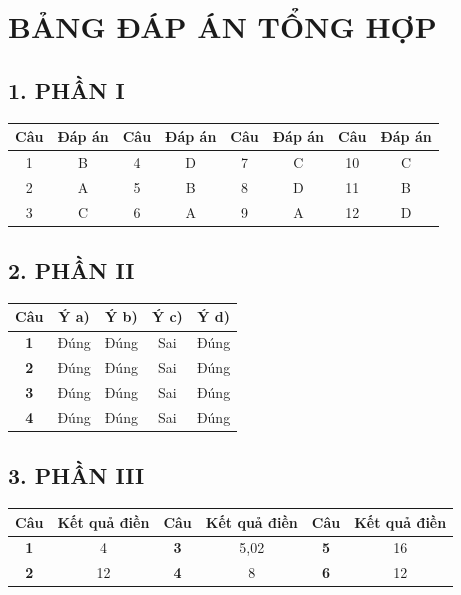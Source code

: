 \documentclass[12pt,a4paper]{article}
\begin{document}
\begin{enumerate}[label=\textbf{Câu \arabic*:}, leftmargin=*]
\end{enumerate}

\newpage
\section*{BẢNG ĐÁP ÁN TỔNG HỢP}

\subsection*{1. PHẦN I}
\begin{center}
\begin{tabular}{|c|c||c|c||c|c||c|c|}
\hline
\textbf{Câu} & \textbf{Đáp án} & \textbf{Câu} & \textbf{Đáp án} & \textbf{Câu} & \textbf{Đáp án} & \textbf{Câu} & \textbf{Đáp án} \\ \hline
1 & B & 4 & D & 7 & C & 10 & C \\ \hline
2 & A & 5 & B & 8 & D & 11 & B \\ \hline
3 & C & 6 & A & 9 & A & 12 & D \\ \hline
\end{tabular}
\end{center}

\subsection*{2. PHẦN II}
\begin{center}
\begin{tabular}{|c|c|c|c|c|}
\hline
\textbf{Câu} & \textbf{Ý a)} & \textbf{Ý b)} & \textbf{Ý c)} & \textbf{Ý d)} \\ \hline
\textbf{1} & Đúng & Đúng & Sai & Đúng \\ \hline
\textbf{2} & Đúng & Đúng & Sai & Đúng \\ \hline
\textbf{3} & Đúng & Đúng & Sai & Đúng \\ \hline
\textbf{4} & Đúng & Đúng & Sai & Đúng \\ \hline
\end{tabular}
\end{center}

\subsection*{3. PHẦN III}
\begin{center}
\begin{tabular}{|c|c||c|c||c|c|}
\hline
\textbf{Câu} & \textbf{Kết quả điền} & \textbf{Câu} & \textbf{Kết quả điền} & \textbf{Câu} & \textbf{Kết quả điền} \\ \hline
\textbf{1} & 4 & \textbf{3} & 5,02 & \textbf{5} & 16 \\ \hline
\textbf{2} & 12 & \textbf{4} & 8 & \textbf{6} & 12 \\ \hline
\end{tabular}
\end{center}
\end{document}
